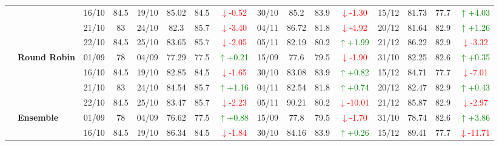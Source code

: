 {\begin{longtable}{llcc|cccc|cccc|cccc}
&
& 16/10 & 84.5 & 19/10 & 85.02 & 84.5 & \textcolor{red}{\(\downarrow\)-0.52} & 30/10 & 85.2 & 83.9 & \textcolor{red}{\(\downarrow\)-1.30} & 15/12 & 81.73 & 77.7 & \textcolor{green}{\(\uparrow\)+4.03} \\

&
& 21/10 & 83 & 24/10 & 82.3 & 85.7 & \textcolor{red}{\(\downarrow\)-3.40} & 04/11 & 86.72 & 81.8 & \textcolor{red}{\(\downarrow\)-4.92} & 20/12 & 81.64 & 82.9 & \textcolor{green}{\(\uparrow\)+1.26} \\

&
& 22/10 & 84.5 & 25/10 & 83.65 & 85.7 & \textcolor{red}{\(\downarrow\)-2.05} & 05/11 & 82.19 & 80.2 & \textcolor{green}{\(\uparrow\)+1.99} & 21/12 & 86.22 & 82.9 & \textcolor{red}{\(\downarrow\)-3.32} \\
\cmidrule(lr){2-16}


& \textbf{Round Robin}
& 01/09 & 78 & 04/09 & 77.29 & 77.5 & \textcolor{green}{\(\uparrow\)+0.21} & 15/09 & 77.6 & 79.5 & \textcolor{red}{\(\downarrow\)-1.90} & 31/10 & 82.25 & 82.6 & \textcolor{green}{\(\uparrow\)+0.35} \\

&
& 16/10 & 84.5 & 19/10 & 82.85 & 84.5 & \textcolor{red}{\(\downarrow\)-1.65} & 30/10 & 83.08 & 83.9 & \textcolor{green}{\(\uparrow\)+0.82} & 15/12 & 84.71 & 77.7 & \textcolor{red}{\(\downarrow\)-7.01} \\

&
& 21/10 & 83 & 24/10 & 84.54 & 85.7 & \textcolor{green}{\(\uparrow\)+1.16} & 04/11 & 82.54 & 81.8 & \textcolor{green}{\(\uparrow\)+0.74} & 20/12 & 82.47 & 82.9 & \textcolor{green}{\(\uparrow\)+0.43} \\

&
& 22/10 & 84.5 & 25/10 & 83.47 & 85.7 & \textcolor{red}{\(\downarrow\)-2.23} & 05/11 & 90.21 & 80.2 & \textcolor{red}{\(\downarrow\)-10.01} & 21/12 & 85.87 & 82.9 & \textcolor{red}{\(\downarrow\)-2.97} \\
\cmidrule(lr){2-16}




& \textbf{Ensemble}
& 01/09 & 78 & 04/09 & 76.62 & 77.5 & \textcolor{green}{\(\uparrow\)+0.88} & 15/09 & 77.8 & 79.5 & \textcolor{red}{\(\downarrow\)-1.70} & 31/10 & 78.74 & 82.6 & \textcolor{green}{\(\uparrow\)+3.86} \\

&
& 16/10 & 84.5 & 19/10 & 86.34 & 84.5 & \textcolor{red}{\(\downarrow\)-1.84} & 30/10 & 84.16 & 83.9 & \textcolor{green}{\(\uparrow\)+0.26} & 15/12 & 89.41 & 77.7 & \textcolor{red}{\(\downarrow\)-11.71} \\


\end{longtable}}
